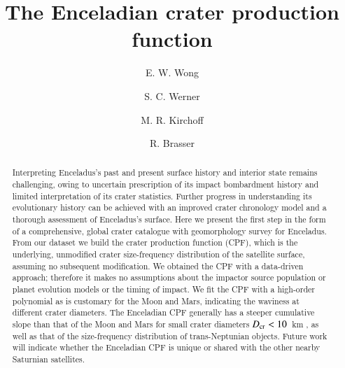 \documentclass[preprint,11pt,3p,times,authoryear]{elsarticle}
\begin{document}
\begin{frontmatter}

\title{The Enceladian crater production function}

\author[UniGe,ELSI]{E. W. Wong}
\author[UiO]{S. C. Werner}
\author[SW]{M. R. Kirchoff}
\author[CSFK,UiO]{R. Brasser}







%
\linenumbers
\begin{abstract}
Interpreting Enceladus’s past and present surface history and interior state remains challenging, owing to uncertain prescription of its impact bombardment history and limited interpretation of its crater statistics. Further progress in understanding its evolutionary history can be achieved with an improved crater chronology model and a thorough assessment of Enceladus’s surface.
Here we present the first step in the form of a comprehensive, global crater catalogue with geomorphology survey for Enceladus. From our dataset we build the crater production function (CPF), which is the underlying, unmodified crater size-frequency distribution of the satellite surface, assuming no subsequent modification.
We obtained the CPF with a data-driven approach;  therefore it makes no assumptions about the impactor source population or planet evolution models or the timing of impact.
We fit the CPF with a high-order polynomial as is customary for the Moon and Mars, indicating the waviness at different crater diameters. The Enceladian CPF generally has a steeper cumulative slope than that of the Moon and Mars for small crater diameters $D_{\rm cr}<10$~km , as well as that of the size-frequency distribution of trans-Neptunian objects. Future work will indicate whether the Enceladian CPF is unique or shared with the other nearby Saturnian satellites.
\end{abstract}


\end{frontmatter}
\end{document}
